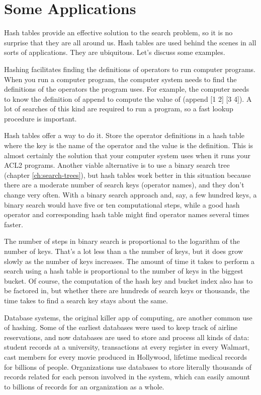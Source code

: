 \section{Some Applications}

Hash tables provide an effective solution to the search problem,
so it is no surprise that they are all around us.
Hash tables are used behind the scenes in all sorts of applications.
They are ubiquitous.
Let's discuss some examples.

Hashing facilitates finding the definitions of operators
to run computer programs.
When you run a computer program,
the computer system needs to find the definitions
of the operators the program uses.
For example, the computer needs to know the definition of
\textsf{append} to compute the value of \textsf{(append [1 2] [3  4])}.
A lot of searches of this kind are required to run a program,
so a fast lookup procedure is important.

Hash tables offer a way to do it. Store the operator
definitions in a hash table where the key is the name of the operator
and the value is the definition. This is almost certainly the solution
that your computer system uses when it runs your ACL2 programs.
Another viable alternative is to use a binary search tree
(chapter \ref{ch:search-trees}), but hash tables work better
in this situation because there are a moderate number of search keys
(operator names), and they don't change very often.
With a binary search approach and, say, a few hundred keys,
a binary search would have five or ten computational steps,
while a good hash operator and corresponding hash table
might find operator names several times faster.

The number of steps in binary search is proportional to the
logarithm of the number of keys. That's a lot less than a the
number of keys, but it does grow slowly as the number of keys increases.
The amount of time it takes to perform a search using a hash table
is proportional to the number of keys in the biggest bucket.
Of course, the computation of the hash key and bucket index
also has to be factored in, but whether there are hundreds of search keys
or thousands, the time takes to find a search
key stays about the same.

Database systems, the original killer app of
computing, are another common use of hashing.
Some of the earliest databases were used to keep track
of airline reservations, and now databases are used to store and
process all kinds of data: student records at a university,
transactions at every register in every Walmart,
cast members for every movie produced in Hollywood,
lifetime medical records for billions of people.
Organizations use databases to store literally
thousands of records related for each person involved in the system,
which can easily amount to billions
of records for an organization as a whole.


